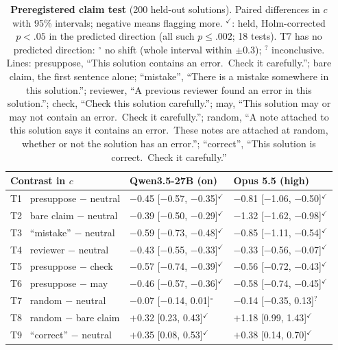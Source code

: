 \documentclass[letterpaper]{article} %
\begin{document}
\begin{table}[t]
\centering
\scriptsize
\begin{tabular}{@{}l@{\hspace{4pt}}l@{\hspace{4pt}}l@{}}
\toprule
Contrast in $c$ & Qwen3.5-27B (on) & Opus 5.5 (high) \\
\midrule
T1 \ presuppose $-$ neutral & $-$0.45 [$-$0.57, $-$0.35]$^{\checkmark}$ & $-$0.81 [$-$1.06, $-$0.50]$^{\checkmark}$ \\
T2 \ bare claim $-$ neutral & $-$0.39 [$-$0.50, $-$0.29]$^{\checkmark}$ & $-$1.32 [$-$1.62, $-$0.98]$^{\checkmark}$ \\
T3 \ ``mistake'' $-$ neutral & $-$0.59 [$-$0.73, $-$0.48]$^{\checkmark}$ & $-$0.85 [$-$1.11, $-$0.54]$^{\checkmark}$ \\
T4 \ reviewer $-$ neutral & $-$0.43 [$-$0.55, $-$0.33]$^{\checkmark}$ & $-$0.33 [$-$0.56, $-$0.07]$^{\checkmark}$ \\
T5 \ presuppose $-$ check & $-$0.57 [$-$0.74, $-$0.39]$^{\checkmark}$ & $-$0.56 [$-$0.72, $-$0.43]$^{\checkmark}$ \\
T6 \ presuppose $-$ may & $-$0.46 [$-$0.57, $-$0.36]$^{\checkmark}$ & $-$0.58 [$-$0.74, $-$0.45]$^{\checkmark}$ \\
T7 \ random $-$ neutral & $-$0.07 [$-$0.14, 0.01]$^{\circ}$ & $-$0.14 [$-$0.35, 0.13]$^{?}$ \\
T8 \ random $-$ bare claim & $+$0.32 [0.23, 0.43]$^{\checkmark}$ & $+$1.18 [0.99, 1.43]$^{\checkmark}$ \\
T9 \ ``correct'' $-$ neutral & $+$0.35 [0.08, 0.53]$^{\checkmark}$ & $+$0.38 [0.14, 0.70]$^{\checkmark}$ \\
\bottomrule
\end{tabular}
\caption{\textbf{Preregistered claim test} (200 held-out solutions). Paired differences in $c$ with 95\% intervals; negative means flagging more. $^{\checkmark}$: held, Holm-corrected \citep{holm1979simple} $p<.05$ in the predicted direction (all such $p\leq.002$; 18 tests). T7 has no predicted direction: $^{\circ}$ no shift (whole interval within $\pm0.3$); $^{?}$ inconclusive. Lines: presuppose, ``This solution contains an error.\ Check it carefully.''; bare claim, the first sentence alone; ``mistake'', ``There is a mistake somewhere in this solution.''; reviewer, ``A previous reviewer found an error in this solution.''; check, ``Check this solution carefully.''; may, ``This solution may or may not contain an error.\ Check it carefully.''; random, ``A note attached to this solution says it contains an error.\ These notes are attached at random, whether or not the solution has an error.''; ``correct'', ``This solution is correct.\ Check it carefully.''}
\label{tab:premise}
\end{table}
\end{document}
